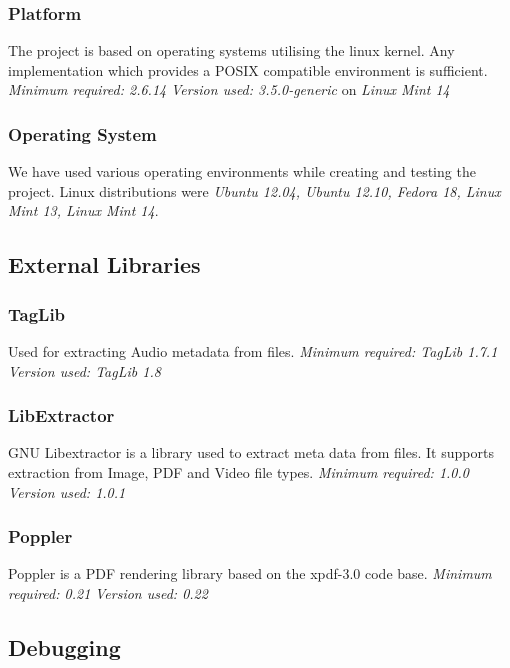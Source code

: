 \subsubsection {Platform}
The project is based on operating systems utilising the linux kernel. Any implementation which provides a POSIX compatible environment is sufficient. \newline
\emph{Minimum required: 2.6.14} \newline
\emph{Version used: 3.5.0-generic} on \emph{Linux Mint 14}

\subsubsection {Operating System}
We have used various operating environments while creating and testing the project. Linux distributions were \emph{Ubuntu 12.04, Ubuntu 12.10, Fedora 18, Linux Mint 13, Linux Mint 14}.

\subsection {External Libraries}
\subsubsection{TagLib}
Used for extracting Audio metadata from files. \newline
\emph{Minimum required: TagLib 1.7.1} \newline
\emph{Version used: TagLib 1.8} 

\subsubsection{LibExtractor}
GNU Libextractor is a library used to extract meta data from files. It supports extraction from Image, PDF and Video file types. \newline
\emph{Minimum required: 1.0.0} \newline
\emph{Version used: 1.0.1}

\subsubsection{Poppler}
Poppler is a PDF rendering library based on the xpdf-3.0 code base. \newline
\emph{Minimum required: 0.21} \newline
\emph{Version used: 0.22}


\subsection{Debugging}
